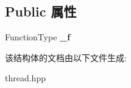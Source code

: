 \subsection*{Public 属性}
\begin{DoxyCompactItemize}
\item 
\mbox{\label{structThread_1_1Func__t_ab783414e8bbebf0e9ac0a7a5576be54c}} 
Function\+Type {\bfseries \+\_\+f}
\end{DoxyCompactItemize}


该结构体的文档由以下文件生成\+:\begin{DoxyCompactItemize}
\item 
thread.\+hpp\end{DoxyCompactItemize}
